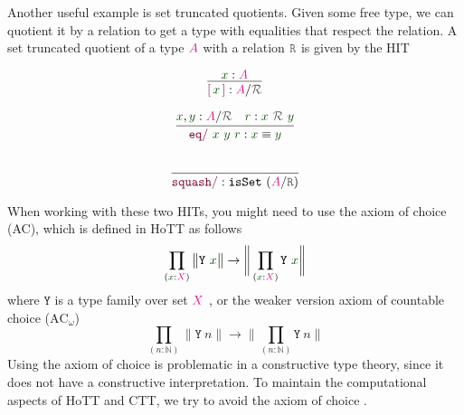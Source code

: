 \documentclass[twoside,11pt,openright]{report}
\theoremstyle{plain} %
\theoremstyle{definition}
\theoremstyle{remark}
\newcommand*{\term}[1]{\textcolor{green!30!black}{#1}} %
\newcommand*{\type}[1]{\textcolor{magenta!90!black}{#1}}
\newcommand*{\relation}[1]{\textcolor{gray!75!black}{\ensuremath{\mathtt{#1}}}}
\newcommand*{\constructor}[1]{\textcolor{purple!60!black}{\ensuremath{\mathtt{#1}}}}
\newcommand*{\typeformer}[1]{\ensuremath{\mathtt{#1}}}
\newcommand*{\quotientconstructor}[1]{\constructor{[}\,#1\,\constructor{]}}
\begin{document}
Another useful example is set truncated quotients. Given some free type, we can quotient it by a relation to get a type with equalities that respect the relation. A set truncated quotient of a type \(\type{A}\) with a relation \(\relation{R}\) is given by the HIT  \\[-10mm]
\begin{center}
  \strut
  \hfill
  \begin{minipage}[b]{0.2\linewidth}
    \begin{equation}
      \vcenter{\infer{\quotientconstructor{\term{x}} : \type{A} / \relation{\mathcal{R}}}{\term{x} : \type{A}}}
    \end{equation}
  \end{minipage}
  \hfill
  \begin{minipage}[b]{0.325\linewidth}
    \begin{equation}
      \vcenter{\infer{\constructor{eq/}~\term{x}~\term{y}~\term{r} : \term{x} \equiv \term{y}}{\term{x}, \term{y} : \type{A} / \relation{\mathcal{R}} & \term{r} : \term{x}~\relation{\mathcal{R}}~\term{y}}}
    \end{equation}
  \end{minipage}
  \hfill
  \begin{minipage}[b]{0.325\linewidth}
    \begin{equation}
      \vcenter{\infer{\constructor{squash/} :\texttt{isSet}~(\type{A} / \relation{R})}{\strut}}
    \end{equation}
  \end{minipage}
  \hfill
  \strut
\end{center}
When working with these two HITs, you might need to use the axiom of choice (AC), which is defined in HoTT as follows
\begin{equation}
  \prod_{(\term{x} : \type{X})} \big\| \typeformer{Y}~\term{x} \big\| \rightarrow \bigg\| \prod_{(\term{x} : \type{X})} \typeformer{Y}~\term{x} \bigg\|
\end{equation}
where \(\typeformer{Y}\) is a type family over set \(\type{X}\) \cite[Section 3.8]{hottbook}, or the weaker version axiom of countable choice (\(\text{AC}_{\omega}\))
\begin{equation}
  \prod_{(n : \mathbb{N})} \big\| \typeformer{Y}~n \big\| \rightarrow \bigg\| \prod_{(n : \mathbb{N})} \typeformer{Y}~n \bigg\|  
\end{equation}
Using the axiom of choice is problematic in a constructive type theory, since it does not have a constructive interpretation. To maintain the computational aspects of HoTT and CTT, we try to avoid the axiom of choice \cite[Introduction]{hottbook}.
\end{document}
